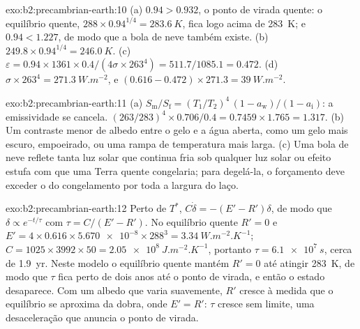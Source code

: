 \begin{solution}{exo:b2:precambrian-earth:10}
(a) $0.94 > 0.932$, o ponto de virada quente: o equilíbrio quente, $288\times0.94^{1/4} =
\qty{283.6}{K}$, fica logo acima de \qty{283}{K}; e $0.94 < 1.227$, de modo que a bola de neve também existe.
(b) $249.8\times0.94^{1/4} = \qty{246.0}{K}$. (c) $\varepsilon = 0.94\times1361\times0.4/(4\sigma
\times263^4) = 511.7/1085.1 = 0.472$. (d) $\sigma\times263^4 = \qty{271.3}{W.m^{-2}}$, e $(0.616
- 0.472)\times271.3 = \qty{39}{W.m^{-2}}$.
\end{solution}

\begin{solution}{exo:b2:precambrian-earth:11}
(a) $S_{\text{m}}/S_{\text{f}} = (T_1/T_2)^4\,(1 - a_{\text{w}})/(1 - a_{\text{i}})$: a
emissividade se cancela. $(263/283)^4\times0.706/0.4 = 0.7459\times1.765 = 1.317$. (b) Um contraste
menor de albedo entre o gelo e a água aberta, como um gelo mais escuro, empoeirado, ou uma rampa de
temperatura mais larga. (c) Uma bola de neve reflete tanta luz solar que continua fria sob qualquer luz solar ou
efeito estufa com que uma Terra quente congelaria; para degelá-la, o forçamento deve exceder o do
congelamento por toda a largura do laço.
\end{solution}

\begin{solution}{exo:b2:precambrian-earth:12}
Perto de $T^*$, $C\dot\delta = -(E' - R')\delta$, de modo que $\delta \propto e^{-t/\tau}$ com $\tau =
C/(E' - R')$. No equilíbrio quente $R' = 0$ e $E' = 4\times0.616\times\num{5.670e-8}\times
288^3 = \qty{3.34}{W.m^{-2}.K^{-1}}$; $C = 1025\times3992\times50 = \qty{2.05e8}{J.m^{-2}.K^{-1}}$,
portanto $\tau = \qty{6.1e7}{s}$, cerca de \qty{1.9}{yr}. Neste modelo o equilíbrio quente mantém $R' =
0$ até atingir \qty{283}{K}, de modo que $\tau$ fica perto de dois anos até o ponto de virada, e então
o estado desaparece. Com um albedo que varia suavemente, $R'$ cresce à medida que o equilíbrio se aproxima da
dobra, onde $E' = R'$: $\tau$ cresce sem limite, uma desaceleração que anuncia o ponto
de virada.
\end{solution}

